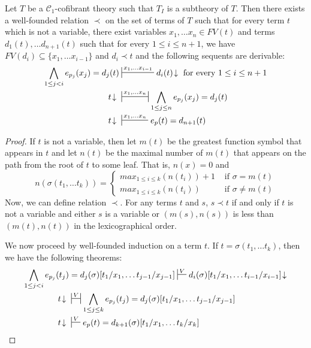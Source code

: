 \documentclass[reqno]{amsart}
\theoremstyle{definition}
\theoremstyle{remark}
\newcommand{\cof}{\mathcal{C}}
\numberwithin{figure}{section}
\begin{document}
\begin{lem}
Let $T$ be a $\cof_1$-cofibrant theory such that $T_I$ is a subtheory of $T$.
Then there exists a well-founded relation $\prec$ on the set of terms of $T$ such that
for every term $t$ which is not a variable, there exist variables $x_1, \ldots x_n \in FV(t)$ and terms $d_1(t), \ldots d_{n+1}(t)$ such that for every $1 \leq i \leq n+1$,
we have $FV(d_i) \subseteq \{ x_1, \ldots x_{i-1} \}$ and $d_i \prec t$ and the following sequents are derivable:
\begin{align*}
\bigwedge_{1 \leq j < i} e_{p_j}(x_j) = d_j(t) & \sststile{}{x_1, \ldots x_{i-1}} d_i(t)\!\downarrow \text{ for every } 1 \leq i \leq n+1 \\
t\!\downarrow\ & \ssststile{}{x_1, \ldots x_n} \bigwedge_{1 \leq j \leq n} e_{p_j}(x_j) = d_j(t) \\
t\!\downarrow\ & \sststile{}{x_1, \ldots x_n} e_p(t) = d_{n+1}(t)
\end{align*}
\end{lem}
\begin{proof}
If $t$ is not a variable, then let $m(t)$ be the greatest function symbol that appears in $t$ and
let $n(t)$ be the maximal number of $m(t)$ that appears on the path from the root of $t$ to some leaf.
That is, $n(x) = 0$ and
\[ n(\sigma(t_1, \ldots t_k)) = \left\{
  \begin{array}{lr}
    max_{1 \leq i \leq k}(n(t_i)) + 1 & \text{ if } \sigma = m(t) \\
    max_{1 \leq i \leq k}(n(t_i))     & \text{ if } \sigma \neq m(t)
  \end{array}
\right. \]
Now, we can define relation $\prec$.
For any terms $t$ and $s$, $s \prec t$ if and only if $t$ is not a variable and either $s$ is a variable or $(m(s),n(s))$ is less than $(m(t),n(t))$ in the lexicographical order.

We now proceed by well-founded induction on a term $t$.
If $t = \sigma(t_1, \ldots t_k)$, then we have the following theorems:
\begin{align*}
\bigwedge_{1 \leq j < i} e_{p_j}(t_j) & = d_j(\sigma)[t_1/x_1, \ldots t_{j-1}/x_{j-1}] \sststile{}{V} d_i(\sigma)[t_1/x_1, \ldots t_{i-1}/x_{i-1}]\!\downarrow \\
t\!\downarrow\ & \ssststile{}{V} \bigwedge_{1 \leq j \leq k} e_{p_j}(t_j) = d_j(\sigma)[t_1/x_1, \ldots t_{j-1}/x_{j-1}] \\
t\!\downarrow\ & \sststile{}{V} e_p(t) = d_{k+1}(\sigma)[t_1/x_1, \ldots t_k/x_k]
\end{align*}
\end{proof}
\end{document}
